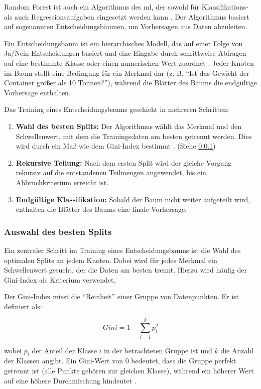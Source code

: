 Random Forest ist auch ein Algorithmus des \gls{ml}, der sowohl für Klassifikations- als auch Regressionsaufgaben eingesetzt werden kann \cite{Breiman2001}. Der Algorithmus basiert auf sogenannten Entscheidungsbäumen, um Vorhersagen aus Daten abzuleiten. 

Ein Entscheidungsbaum ist ein hierarchisches Modell, das auf einer Folge von Ja/Nein-Entscheidungen basiert und eine Eingabe durch schrittweise Abfragen auf eine bestimmte Klasse oder einen numerischen Wert zuordnet \cite{Breiman2001}.  
Jeder Knoten im Baum stellt eine Bedingung für ein Merkmal dar (z. B. \enquote{Ist das Gewicht der Container größer als 10 Tonnen?}), während die Blätter des Baums die endgültige Vorhersage enthalten.  
 
Das Training eines Entscheidungsbaums geschieht in mehreren Schritten:

\begin{enumerate}[noitemsep]
    \item \textbf{Wahl des besten Splits:}  
    Der Algorithmus wählt das Merkmal und den Schwellenwert, mit dem die Trainingsdaten am besten getrennt werden.  
    Dies wird durch ein Maß wie dem Gini-Index bestimmt \cite{5994250}. (Siehe \ref{sec:rf_gini_split})
    \item \textbf{Rekursive Teilung:}  
    Nach dem ersten Split wird der gleiche Vorgang rekursiv auf die entstandenen Teilmengen angewendet, bis ein Abbruchkriterium erreicht ist.
    \item \textbf{Endgültige Klassifikation:}  
    Sobald der Baum nicht weiter aufgeteilt wird, enthalten die Blätter des Baums eine finale Vorhersage.
\end{enumerate}

\subsubsection{Auswahl des besten Splits}
\label{sec:rf_gini_split}
Ein zentraler Schritt im Training eines Entscheidungsbaums ist die Wahl des optimalen Splits an jedem Knoten.  
Dabei wird für jedes Merkmal ein Schwellenwert gesucht, der die Daten am besten trennt.  
Hierzu wird häufig der Gini-Index als Kriterium verwendet.

Der Gini-Index misst die \enquote{Reinheit} einer Gruppe von Datenpunkten.  
Er ist definiert als:

\[
Gini = 1 - \sum_{i=1}^{k} p_i^2
\]

wobei \(p_i\) der Anteil der Klasse \(i\) in der betrachteten Gruppe ist und \(k\) die Anzahl der Klassen angibt.  
Ein Gini-Wert von 0 bedeutet, dass die Gruppe perfekt getrennt ist (alle Punkte gehören zur gleichen Klasse), während ein höherer Wert auf eine höhere Durchmischung hindeutet \cite{5994250}.

